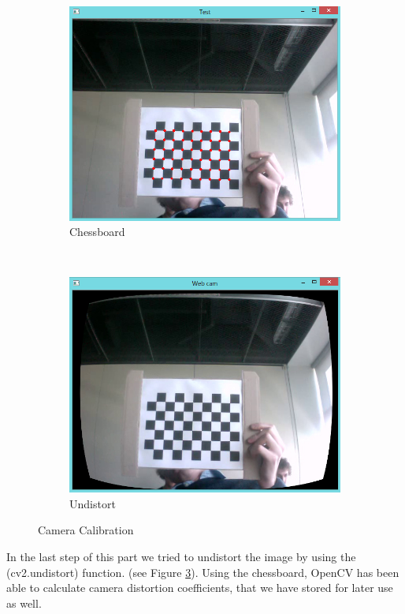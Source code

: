  \begin{figure}[h!]
	\begin{subfigure}[b]{0.5\textwidth}
		\includegraphics[width=\textwidth]{Handin3/images/patterndot.jpg}
		\caption{Chessboard}
		\label{subfig:chesspattern}
	\end{subfigure}
	~
	\begin{subfigure}[b]{0.5\textwidth}
		\includegraphics[width=\textwidth]{Handin3/images/undistort.jpg}
		\caption{Undistort}
		\label{subfig:undistort}
	\end{subfigure}
	
	\caption{Camera Calibration}
\end{figure}
 
In the last step of this part we tried to undistort the image by using the (cv2.undistort) function. (see Figure \ref{subfig:undistort}). Using the chessboard, OpenCV has been able to calculate camera distortion coefficients, that we have stored for later use as well.

 
